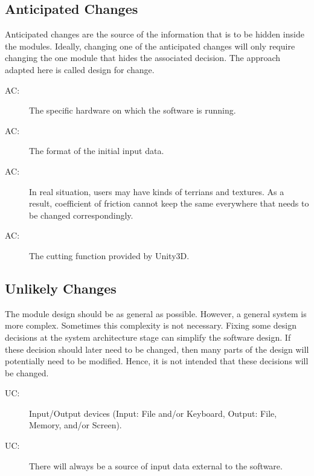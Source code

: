 \documentclass[12pt, titlepage]{article}
\newcounter{acnum}
\newcommand{\actheacnum}{AC\theacnum}
\newcounter{ucnum}
\newcommand{\uctheucnum}{UC\theucnum}
\begin{document}
	\subsection{Anticipated Changes} \label{SecAchange}
	
	Anticipated changes are the source of the information that is to be hidden
	inside the modules. Ideally, changing one of the anticipated changes will only
	require changing the one module that hides the associated decision. The approach
	adapted here is called design for
	change.
	
	\begin{description}
		\item[ \actheacnum \label{acHardware}:] The specific
		hardware on which the software is running.
		\item[ \actheacnum \label{acInput}:] The format of the
		initial input data.
		\item[ \actheacnum \label{acFri}:] In real situation, users may have kinds of terrians and textures.
		As a result, coefficient of friction cannot keep the same everywhere that needs to be changed correspondingly.
		\item[ \actheacnum \label{acCF}:] The cutting function provided by Unity3D. 
	\end{description}
	
	\subsection{Unlikely Changes} \label{SecUchange}
	
	The module design should be as general as possible. However, a general system is
	more complex. Sometimes this complexity is not necessary. Fixing some design
	decisions at the system architecture stage can simplify the software design. If
	these decision should later need to be changed, then many parts of the design
	will potentially need to be modified. Hence, it is not intended that these
	decisions will be changed.
	
	\begin{description}
		\item[ \uctheucnum \label{ucIO}:] Input/Output devices
		(Input: File and/or Keyboard, Output: File, Memory, and/or Screen).
		\item[ \uctheucnum \label{ucInput}:] There will always be
		a source of input data external to the software.
	\end{description}
	
\end{document}
